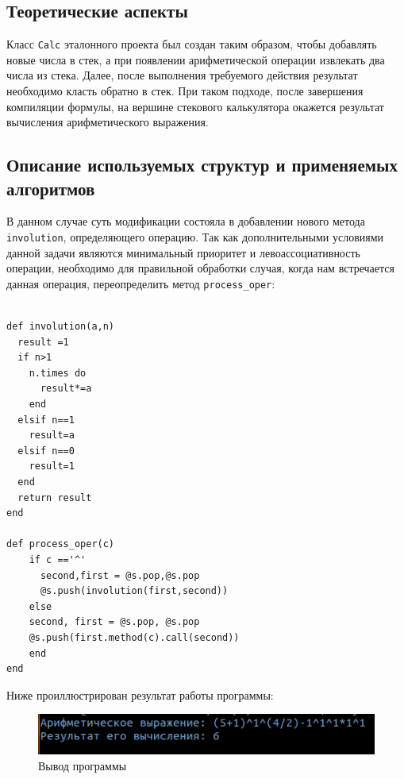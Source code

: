 \subsection*{Теоретические аспекты}
  Класс \verb|Calc| эталонного проекта был создан таким образом, чтобы добавлять новые числа в стек, а при появлении арифметической операции извлекать два числа из стека. Далее, после выполнения требуемого действия результат необходимо класть обратно в стек. При таком подходе, после завершения компиляции формулы, на вершине стекового калькулятора окажется результат вычисления арифметического выражения.
\subsection*{Описание используемых структур и применяемых алгоритмов}
 В данном случае суть модификации состояла в добавлении нового метода \\ \verb|involution|, определяющего операцию. Так как дополнительными условиями данной задачи являются минимальный приоритет и левоассоциативность операции, необходимо для правильной обработки случая, когда нам встречается данная операция, переопределить метод \verb|process_oper|:


\begin{lstlisting}

def involution(a,n)
  result =1
  if n>1
    n.times do
      result*=a
    end
  elsif n==1
    result=a
  elsif n==0
    result=1
  end
  return result
end

def process_oper(c)
    if c =='^'
      second,first = @s.pop,@s.pop
      @s.push(involution(first,second))
    else
    second, first = @s.pop, @s.pop
    @s.push(first.method(c).call(second))
    end
end
\end{lstlisting}

Ниже проиллюстрирован результат работы программы:
\begin{figure}[ht!]
\begin{center}
\includegraphics[width=0.8\hsize]{images/screen2}
\end{center}
\caption{Вывод программы}\label{fig:screen2}
\end{figure}
